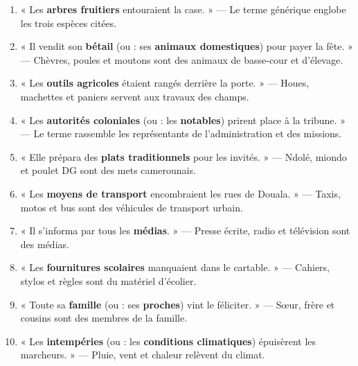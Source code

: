 \documentclass[11pt]{article}
\begin{document}
\begin{corrige}
\begin{enumerate}
\item « Les \textbf{arbres fruitiers} entouraient la case. » — Le terme générique englobe les trois espèces citées.
\item « Il vendit son \textbf{bétail} (ou : ses \textbf{animaux domestiques}) pour payer la fête. » — Chèvres, poules et moutons sont des animaux de basse-cour et d'élevage.
\item « Les \textbf{outils agricoles} étaient rangés derrière la porte. » — Houes, machettes et paniers servent aux travaux des champs.
\item « Les \textbf{autorités coloniales} (ou : les \textbf{notables}) prirent place à la tribune. » — Le terme rassemble les représentants de l'administration et des missions.
\item « Elle prépara des \textbf{plats traditionnels} pour les invités. » — Ndolé, miondo et poulet DG sont des mets camerounais.
\item « Les \textbf{moyens de transport} encombraient les rues de Douala. » — Taxis, motos et bus sont des véhicules de transport urbain.
\item « Il s'informa par tous les \textbf{médias}. » — Presse écrite, radio et télévision sont des médias.
\item « Les \textbf{fournitures scolaires} manquaient dans le cartable. » — Cahiers, stylos et règles sont du matériel d'écolier.
\item « Toute sa \textbf{famille} (ou : ses \textbf{proches}) vint le féliciter. » — Sœur, frère et cousins sont des membres de la famille.
\item « Les \textbf{intempéries} (ou : les \textbf{conditions climatiques}) épuisèrent les marcheurs. » — Pluie, vent et chaleur relèvent du climat.
\end{enumerate}
\end{corrige}
\end{document}
